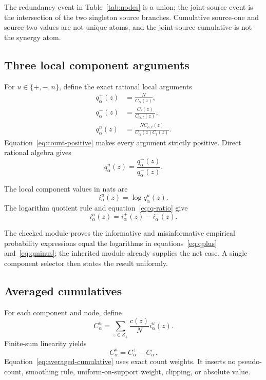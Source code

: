 \documentclass[11pt]{article}
\theoremstyle{definition}
\begin{document}
The redundancy event in Table~\ref{tab:nodes} is a union; the joint-source event is the
intersection of the two singleton source branches.  Cumulative source-one and source-two values are
not unique atoms, and the joint-source cumulative is not the synergy atom.

\subsection{Three local component arguments}

For \(u\in\{+,-,n\}\), define the exact rational local arguments
\begin{align}
q^+_\alpha(z)&=\frac{N}{C_\alpha(z)},\label{eq:qplus}\\
q^-_\alpha(z)&=\frac{C_t(z)}{C_{\alpha,t}(z)},\label{eq:qminus}\\
q^n_\alpha(z)&=\frac{N C_{\alpha,t}(z)}{C_\alpha(z)C_t(z)}.
\label{eq:qnet}
\end{align}
Equation~\eqref{eq:count-positive} makes every argument strictly positive.  Direct rational
algebra gives
\begin{equation}\label{eq:q-ratio}
q^n_\alpha(z)=\frac{q^+_\alpha(z)}{q^-_\alpha(z)}.
\end{equation}

The local component values in nats are
\begin{equation}\label{eq:local-components}
i^u_\alpha(z)=\log q^u_\alpha(z).
\end{equation}
The logarithm quotient rule and equation~\eqref{eq:q-ratio} give
\begin{equation}\label{eq:local-net}
i^n_\alpha(z)=i^+_\alpha(z)-i^-_\alpha(z).
\end{equation}

The checked module proves the informative and misinformative empirical probability expressions equal
the logarithms in equations~\eqref{eq:qplus} and~\eqref{eq:qminus}; the inherited module already
supplies the net case.  A single component selector then states the result uniformly.

\subsection{Averaged cumulatives}

For each component and node, define
\begin{equation}\label{eq:averaged-cumulative}
C^u_\alpha
=\sum_{z\in Z_+}\frac{c(z)}{N}i^u_\alpha(z).
\end{equation}
Finite-sum linearity yields
\begin{equation}\label{eq:averaged-net}
C^n_\alpha=C^+_\alpha-C^-_\alpha.
\end{equation}
Equation~\eqref{eq:averaged-cumulative} uses exact count weights.  It inserts no pseudo-count,
smoothing rule, uniform-on-support weight, clipping, or absolute value.
\end{document}

